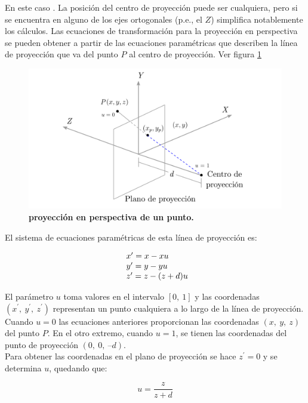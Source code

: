 En este caso  \citep{Ramos2011}. La posición del centro de proyección puede ser cualquiera, pero si se encuentra en alguno de los ejes ortogonales (p.e., el $Z$) simplifica notablemente los cálculos.
Las ecuaciones de transformación para la proyección en perspectiva se pueden obtener a partir de las ecuaciones paramétricas que describen la línea de proyección que va del punto $P$ al centro de proyección. Ver figura \ref{geo-per7}

\begin{figure}[h]
    \includegraphics[width=12cm]{Img/GEO/geo-per-7.png}
    \centering
    \caption{\footnotesize{\textbf{proyección en perspectiva de un punto.}}}
    \label{geo-per7}
\end{figure}

El sistema de ecuaciones paramétricas de esta línea de proyección es:

$$
\begin{array}{l@{}l}
        x^{\prime} = x - xu\\
        y^{\prime} = y - yu\\
        z^{\prime} = z - (z+d)u
\end{array}
$$

El parámetro $u$ toma valores en el intervalo $[0, \ 1]$ y las coordenadas $(x^{\prime}, \ y^{\prime}, \ z^{\prime})$ representan un punto cualquiera a lo largo de la línea de proyección. Cuando $u = 0$ las ecuaciones anteriores proporcionan las coordenadas $(x, \ y, \ z)$ del punto $P$. En el otro extremo, cuando $u = 1$, se tienen las coordenadas del punto de proyección $(0, \ 0, \ –d)$.\\
Para obtener las coordenadas en el plano de proyección se hace $z^{\prime} = 0$ y se determina $u$, quedando que:

$$u = \frac{z}{z + d}$$

